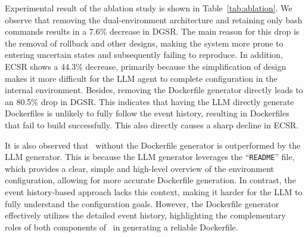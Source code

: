 Experimental result of the ablation study is shown in Table~\ref{tab:ablation}. We observe that removing the dual-environment architecture and retaining only bash commands results in a 7.6\% decrease in DGSR. The main reason for this drop is the removal of rollback and other designs, making the system more prone to entering uncertain states and subsequently failing to reproduce. In addition, ECSR shows a 44.3\% decrease, primarily because the simplification of design makes it more difficult for the LLM agent to complete configuration in the internal environment. Besides, removing the Dockerfile generator directly leads to an 80.5\% drop in DGSR. This indicates that having the LLM directly generate Dockerfiles is unlikely to fully follow the event history, resulting in Dockerfiles that fail to build successfully. This also directly causes a sharp decline in ECSR.

It is also observed that \tool~without the Dockerfile generator is outperformed by the LLM generator. This is because the LLM generator leverages the ``\texttt{README}'' file, which provides a clear, simple and high-level overview of the environment configuration, allowing for more accurate Dockerfile generation. In contrast, the event history-based approach lacks this context, making it harder for the LLM to fully understand the configuration goals. However, the Dockerfile generator effectively utilizes the detailed event history, highlighting the complementary roles of both components of \tool~in generating a reliable Dockerfile.





